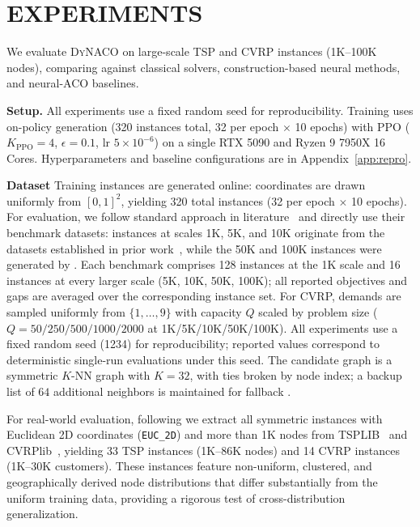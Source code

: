 \documentclass[sigconf]{acmart}
\newcommand{\DyNACO}{\textsc{DyNACO}}
\begin{document}
\section{EXPERIMENTS}
\label{sec:experiments}

We evaluate \DyNACO{} on large-scale TSP and CVRP instances (1K--100K nodes), comparing against classical solvers, construction-based neural methods, and neural-ACO baselines.


\smallskip\noindent\textbf{Setup.}
All experiments use a fixed random seed for reproducibility.
Training uses on-policy generation (320 instances total, 32 per epoch $\times$ 10 epochs) with PPO ($K_{\text{PPO}}{=}4$, $\epsilon{=}0.1$, lr $5{\times}10^{-6}$) on a single RTX 5090 and Ryzen 9 7950X 16 Cores.
Hyperparameters and baseline configurations are in Appendix~\ref{app:repro}.

\smallskip\noindent\textbf{Dataset}
Training instances are generated online: coordinates are drawn uniformly from $[0,1]^2$, yielding 320 total instances (32 per epoch $\times$ 10 epochs).
For evaluation, we follow standard approach in literature~\cite{attentionmodel, pomo, lehd, sil} and directly use their benchmark datasets: instances at scales 1K, 5K, and 10K originate from the datasets established in prior work~\cite{attentionmodel, pomo, lehd}, while the 50K and 100K instances were generated by \cite{sil}.
Each benchmark comprises 128 instances at the 1K scale and 16 instances at every larger scale (5K, 10K, 50K, 100K); all reported objectives and gaps are averaged over the corresponding instance set.
For CVRP, demands are sampled uniformly from $\{1,\ldots,9\}$ with capacity $Q$ scaled by problem size ($Q{=}50/250/500/1000/2000$ at 1K/5K/10K/50K/100K).
All experiments use a fixed random seed (1234) for reproducibility; reported values correspond to deterministic single-run evaluations under this seed.
The candidate graph is a symmetric $K$-NN graph with $K{=}32$, with ties broken by node index; a backup list of $64$ additional neighbors is maintained for fallback \cite{ACOTSP-MF}.

For real-world evaluation, following \cite{sil} we extract all symmetric instances with Euclidean 2D coordinates (\texttt{EUC\_2D}) and more than 1K nodes from TSPLIB~\cite{tsplib} and CVRPlib~\cite{cvrplib}, yielding 33 TSP instances (1K--86K nodes) and 14 CVRP instances (1K--30K customers).
These instances feature non-uniform, clustered, and geographically derived node distributions that differ substantially from the uniform training data, providing a rigorous test of cross-distribution generalization.
\end{document}
